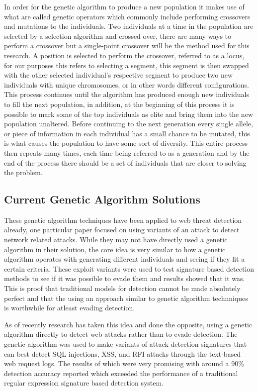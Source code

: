 In order for the genetic algorithm to produce a new population it makes use of what are called genetic operators which commonly include performing crossovers and mutations to the individuals.  Two individuals at a time in the population are selected by a selection algorithm and crossed over, there are many ways to perform a crossover but a single-point crossover will be the method used for this research.  A position is selected to perform the crossover, referred to as a locus, for our purposes this refers to selecting a segment, this segment is then swapped with the other selected individual's respective segment to produce two new individuals with unique chromosomes, or in other words different configurations.  This process continues until the algorithm has produced enough new individuals to fill the next population, in addition, at the beginning of this process it is possible to mark some of the top individuals as elite and bring them into the new population unaltered.  Before continuing to the next generation every single allele, or piece of information in each individual has a small chance to be mutated, this is what causes the population to have some sort of diversity.  This entire process then repeats many times, each time being referred to as a generation and by the end of the process there should be a set of individuals that are closer to solving the problem.\cite{matlabGenetic}

\subsection{Current Genetic Algorithm Solutions} \label{sec:currentGenSolutions}

These genetic algorithm techniques have been applied to web threat detection already, one particular paper focused on using variants of an attack to detect network related attacks.  While they may not have directly used a genetic algorithm in their solution, the core idea is very similar to how a genetic algorithm operates with generating different individuals and seeing if they fit a certain criteria.  These exploit variants were used to test signature based detection methods to see if it was possible to evade them and results showed that it was.  This is proof that traditional models for detection cannot be made absolutely perfect and that the using an approach similar to genetic algorithm technniques is worthwhile for atleast evading detection. \cite{testingNetworkBased}

As of recently research has taken this idea and done the opposite, using a genetic algorithm directly to detect web attacks rather than to evade detection.  The genetic algorithm was used to make variants of attack detection signatures that can best detect SQL injections, XSS, and RFI attacks through the text-based web request logs.  The results of which were very promising with around a 90\% detection accuracy reported which exceeded the performance of a traditional regular expression signature based detection system. \cite{mainPaper}

